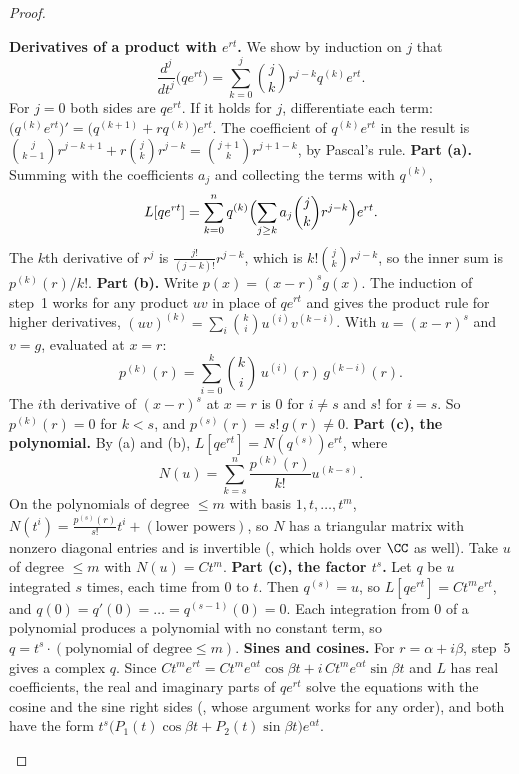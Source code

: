 \documentclass[10pt]{scrartcl}
\begin{document}
\begin{proof}
  \begin{steps}
    \ii \textbf{Derivatives of a product with $e^{rt}$.} We show by induction on $j$ that
    \[
      \frac{d^j}{dt^j}\bigl(qe^{rt}\bigr)=\sum_{k=0}^j\binom jk r^{j-k}q^{(k)}e^{rt}.
    \] For $j=0$ both sides are $qe^{rt}$. If it holds for $j$, differentiate each term: $\bigl(q^{(k)}e^{rt}\bigr)'=\bigl(q^{(k+1)}+rq^{(k)}\bigr)e^{rt}$. The coefficient of $q^{(k)}e^{rt}$ in the result is $\binom j{k-1}r^{j-k+1}+r\binom jk r^{j-k}=\binom{j+1}k r^{j+1-k}$, by Pascal's rule.
    \ii \textbf{Part (a).} Summing with the coefficients $a_j$ and collecting the terms with $q^{(k)}$,
    \[
      L[qe^{rt}]=\sum_{k=0}^n q^{(k)}\Bigl(\sum_{j\ge k}a_j\binom jk r^{j-k}\Bigr)e^{rt}.
    \]
    The $k$th derivative of $r^j$ is $\frac{j!}{(j-k)!}r^{j-k}$, which is $k!\binom jk r^{j-k}$, so the inner sum is $p^{(k)}(r)/k!$.
    \ii \textbf{Part (b).} Write $p(x)=(x-r)^sg(x)$. The induction of step~1 works for any product $uv$ in place of $qe^{rt}$ and gives the product rule for higher derivatives, $(uv)^{(k)}=\sum_i\binom ki u^{(i)}v^{(k-i)}$. With $u=(x-r)^s$ and $v=g$, evaluated at $x=r$:
    \[
      p^{(k)}(r)=\sum_{i=0}^k\binom ki\,u^{(i)}(r)\,g^{(k-i)}(r).
    \] The $i$th derivative of $(x-r)^s$ at $x=r$ is $0$ for $i\neq s$ and $s!$ for $i=s$. So $p^{(k)}(r)=0$ for $k<s$, and $p^{(s)}(r)=s!\,g(r)\neq 0$.
    \ii \textbf{Part (c), the polynomial.} By (a) and (b), $L[qe^{rt}]=N(q^{(s)})e^{rt}$, where
    \[
      N(u)=\sum_{k=s}^n\frac{p^{(k)}(r)}{k!}u^{(k-s)}.
    \] On the polynomials of degree $\le m$ with basis $1,t,\dots,t^m$, $N(t^i)=\frac{p^{(s)}(r)}{s!}t^i+(\text{lower powers})$, so $N$ has a triangular matrix with nonzero diagonal entries and is invertible (, which holds over $\CC$ as well). Take $u$ of degree $\le m$ with $N(u)=Ct^m$.
    \ii \textbf{Part (c), the factor $t^s$.} Let $q$ be $u$ integrated $s$ times, each time from $0$ to $t$. Then $q^{(s)}=u$, so $L[qe^{rt}]=Ct^me^{rt}$, and $q(0)=q'(0)=\dots=q^{(s-1)}(0)=0$. Each integration from $0$ of a polynomial produces a polynomial with no constant term, so $q=t^s\cdot(\text{polynomial of degree}\le m)$.
    \ii \textbf{Sines and cosines.} For $r=\alpha+i\beta$, step~5 gives a complex $q$. Since $Ct^me^{rt}=Ct^me^{\alpha t}\cos\beta t+i\,Ct^me^{\alpha t}\sin\beta t$ and $L$ has real coefficients, the real and imaginary parts of $qe^{rt}$ solve the equations with the cosine and the sine right sides (, whose argument works for any order), and both have the form $t^s\bigl(P_1(t)\cos\beta t+P_2(t)\sin\beta t\bigr)e^{\alpha t}$. \qedhere
  \end{steps}
\end{proof}
\end{document}
